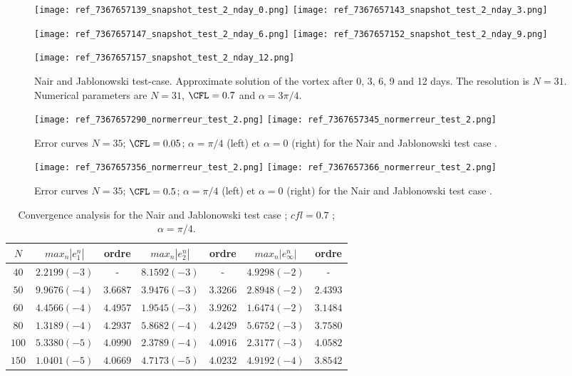 \begin{figure}[ht!]
\texttt{[image: ref\_7367657139\_snapshot\_test\_2\_nday\_0.png]}
\texttt{[image: ref\_7367657143\_snapshot\_test\_2\_nday\_3.png]}

\texttt{[image: ref\_7367657147\_snapshot\_test\_2\_nday\_6.png]}
\texttt{[image: ref\_7367657152\_snapshot\_test\_2\_nday\_9.png]}

\texttt{[image: ref\_7367657157\_snapshot\_test\_2\_nday\_12.png]}
\caption{Nair and Jablonowski test-case. Approximate solution of the vortex after 
0, 3, 6, 9 and 12 days. The resolution is $N=31$. Numerical parameters are 
$N=31$, $\CFL = 0.7$ and $\alpha = 3 \pi / 4$.}
\label{SNAPSHOT_NJ}
\end{figure}

\begin{figure}[ht!]
\texttt{[image: ref\_7367657290\_normerreur\_test\_2.png]}
\texttt{[image: ref\_7367657345\_normerreur\_test\_2.png]}
\caption{Error curves $N=35$; $\CFL=0.05$; $\alpha = \pi / 4$ (left) et $\alpha = 0$ (right) for the Nair and Jablonowski test case \cite{Nair-Jablonowski}.}
\label{erreur_cfl=0.05a}
\end{figure}

\begin{figure}[ht!]
\texttt{[image: ref\_7367657356\_normerreur\_test\_2.png]}
\texttt{[image: ref\_7367657366\_normerreur\_test\_2.png]}
\caption{Error curves $N=35$; $\CFL=0.5$; $\alpha = \pi / 4$ (left) et $\alpha = 0$ (right) for the Nair and Jablonowski test case \cite{Nair-Jablonowski}.}
\label{erreur_cfl=0.5a}
\end{figure}

\begin{table}[ht!]
\begin{tabular}{|c||cc|cc|cc|}
\hline
$N$ & $max_n |e_1^n|$ & ordre  & $max_n |e_2^n|$ & ordre  & $max_n |e_{\infty}^n|$ & ordre \\
\hline
\hline
$40$ & $2.2199 (-3)$ & -  & $8.1592 (-3)$ & - & $4.9298 (-2)$  & - \\
\hline 
$50$ & $9.9676 (-4)$ & $3.6687$ & $3.9476(-3)$ & $3.3266$ & $2.8948(-2)$ & $2.4393$ \\
\hline
$60$ & $4.4566(-4)$ & $4.4957$ & $1.9545(-3)$ & $3.9262$ & $1.6474(-2)$ & $3.1484$ \\
\hline
$80$ & $1.3189(-4) $ & $4.2937$ & $5.8682(-4)$ & $4.2429$ & $5.6752(-3)$ & $3.7580$ \\
\hline
$100$ & $5.3380(-5)$ & $4.0990$ & $2.3789 (-4)$ & $4.0916$ & $2.3177(-3)$ & $4.0582$\\
\hline
$150$ & $1.0401 (-5)$ & $4.0669$ & $4.7173 (-5)$ & $4.0232$ & $4.9192(-4)$ & $3.8542$\\
\hline
\end{tabular}
\caption{Convergence analysis for the Nair and Jablonowski test case \cite{Nair-Jablonowski} ; $cfl = 0.7$ ; $\alpha = \pi /4$.}
\label{table:2}
\end{table}

